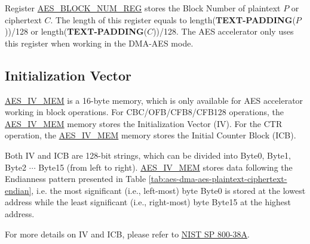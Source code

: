 \documentclass[main\_\_EN.tex]{subfiles}
\begin{document}
Register \hyperref[regdesc:AESBLOCKNUMREG]{AES\_BLOCK\_NUM\_REG} stores the Block Number of plaintext $P$ or ciphertext $C$. The length of this register equals to length({\bfseries TEXT-PADDING}($P$))/128 or length({\bfseries TEXT-PADDING}($C$))/128. The AES accelerator only uses this register when working in the DMA-AES mode.

\subsection{Initialization Vector}\label{sec:aes-init-vector}

\label{memdesc:AESIVMEM}\hyperref[memdesc:AESIVMEM]{AES\_IV\_MEM} is a 16-byte memory, which is only available for AES accelerator working in block operations. For CBC/OFB/CFB8/CFB128 operations, the \hyperref[memdesc:AESIVMEM]{AES\_IV\_MEM} memory stores the Initialization Vector (IV). For the CTR operation, the \hyperref[memdesc:AESIVMEM]{AES\_IV\_MEM} memory stores the Initial Counter Block (ICB).

Both IV and ICB are 128-bit strings, which can be divided into Byte0, Byte1, Byte2 \begin{math}\cdots\end{math} Byte15 (from left to right). \hyperref[memdesc:AESIVMEM]{AES\_IV\_MEM} stores data following the Endianness pattern presented in Table \ref{tab:aes-dma-aes-plaintext-ciphertext-endian}, i.e. the most significant (i.e., left-most) byte Byte0 is stored at the lowest address while the least significant (i.e., right-most) byte Byte15 at the highest address.

For more details on IV and ICB, please refer to \href{https://nvlpubs.nist.gov/nistpubs/Legacy/SP/nistspecialpublication800-38a.pdf}{NIST SP 800-38A}.
\end{document}
